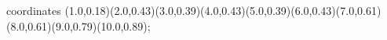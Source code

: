 					coordinates { (1.0,0.18)(2.0,0.43)(3.0,0.39)(4.0,0.43)(5.0,0.39)(6.0,0.43)(7.0,0.61)(8.0,0.61)(9.0,0.79)(10.0,0.89)};